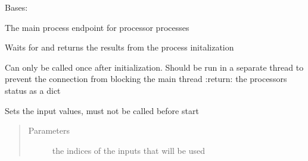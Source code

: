 \documentclass[letterpaper,10pt,english]{sphinxmanual}
\begin{document}
\begin{fulllineitems}
\label{\detokenize{src.processors:src.processors.models.Processor}}
Bases: 

The main process endpoint for processor processes

\begin{fulllineitems}
\label{\detokenize{src.processors:src.processors.models.Processor.retrieve_init_results}}
Waits for and returns the results from the process initalization

Can only be called once after initialization.
Should be run in a separate thread to prevent the connection from blocking the main thread
:return: the processors status as a dict

\end{fulllineitems}


\begin{fulllineitems}
\label{\detokenize{src.processors:src.processors.models.Processor.set_inputs}}
Sets the input values, must not be called before start
\begin{quote}\begin{description}
\item[{Parameters}] \leavevmode
{} \textendash{} the indices of the inputs that will be used

\end{description}\end{quote}


\end{fulllineitems}
\end{fulllineitems}
\end{document}
